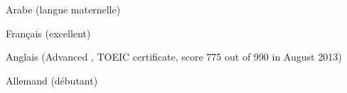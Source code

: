 \begin{cventries}
  \cventry
    {}
    {}
    {}
    {}
    {
      \begin{cvitems}
        \item {Arabe (langue maternelle)}
        \item {Français  (excellent)}
        \item {Anglais (Advanced , TOEIC certificate, score 775 out of 990 in August 2013)}
        \item {Allemand (débutant)}       
      \end{cvitems}
    }
\end{cventries}
